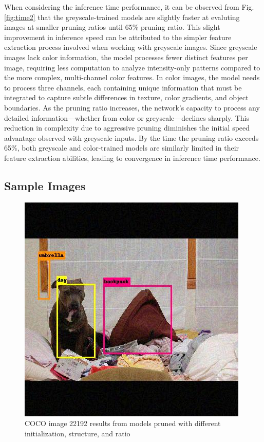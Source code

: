 \documentclass[journal,onecolumn,12pt]{IEEEtran}
\begin{document}
When considering the inference time performance, it can be observed from Fig. \ref{fig:time2} that the greyscale-trained models are slightly faster at evaluting images at smaller pruning ratios until 65\% pruning ratio. This slight improvement in inference speed can be attributed to the simpler feature extraction process involved when working with greyscale images. Since greyscale images lack color information, the model processes fewer distinct features per image, requiring less computation to analyze intensity-only patterns compared to the more complex, multi-channel color features. In color images, the model needs to process three channels, each containing unique information that must be integrated to capture subtle differences in texture, color gradients, and object boundaries. As the pruning ratio increases, the network's capacity to process any detailed information—whether from color or greyscale—declines sharply. This reduction in complexity due to aggressive pruning diminishes the initial speed advantage observed with greyscale inputs. By the time the pruning ratio exceeds 65\%, both greyscale and color-trained models are similarly limited in their feature extraction abilities, leading to convergence in inference time performance.

\subsection{Sample Images}

\begin{figure}
    \centering
    \captionsetup{justification=centering}
    \includegraphics[width=0.6\linewidth]{figures/attack_after_22192.jpg}
    \caption{COCO image 22192 results from models pruned with different initialization, structure, and ratio}
    \label{fig:temp}
\end{figure}
\end{document}
